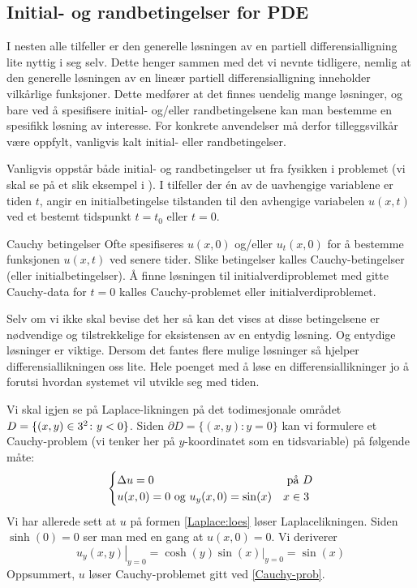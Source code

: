 \subsection{Initial- og randbetingelser for PDE}
I nesten alle tilfeller er den generelle løsningen av en partiell differensialligning
lite nyttig i seg selv. Dette henger sammen med det vi nevnte tidligere, nemlig at den generelle løsningen av en lineær partiell differensialligning inneholder vilkårlige funksjoner. Dette medfører at det finnes uendelig mange løsninger, og bare ved å spesifisere initial- og/eller randbetingelsene kan man bestemme en spesifikk løsning av interesse. For konkrete anvendelser må derfor tilleggsvilkår være oppfylt, vanligvis kalt initial- eller randbetingelser. 

Vanligvis oppstår både initial- og randbetingelser ut fra fysikken i problemet (vi skal se på et slik eksempel i ). I tilfeller der én av de uavhengige variablene er tiden \( t \), angir en initialbetingelse tilstanden til den avhengige variabelen \( u(x, t) \) ved et bestemt tidspunkt \( t = t_0 \) eller \( t = 0 \).
\begin{defn}{Cauchy betingelser}
Ofte spesifiseres \( u(x, 0) \) og/eller \( u_t(x, 0) \) for å bestemme funksjonen \( u(x, t) \) ved senere tider. Slike betingelser kalles Cauchy-betingelser (eller initialbetingelser). Å finne løsningen til initialverdiproblemet med gitte Cauchy-data for \( t = 0 \) kalles Cauchy-problemet eller initialverdiproblemet.
\end{defn}
Selv om vi ikke skal bevise det her så kan det vises at disse betingelsene er nødvendige og tilstrekkelige for eksistensen av en entydig løsning. Og entydige løsninger er viktige. Dersom det fantes flere mulige løsninger så hjelper differensiallikningen oss lite. Hele poenget med å løse en differensiallikninger jo å forutsi hvordan systemet vil utvikle seg med tiden.

\begin{eks}{}Vi skal igjen se på Laplace-likningen på det todimesjonale  området $D=\{(x,y) \in 3^2\colon y <0\}$. Siden $\partial D =\{(x,y) \colon y=0\}$ kan vi formulere et Cauchy-problem (vi tenker her på $y$-koordinatet som en tidsvariable) på følgende måte:
\begin{equation}\label{Cauchy-prob}
\begin{cases}
\Delta u = 0 & \text{ på } D\\
u(x,0)=0 \text{ og } u_y(x,0)=\sin (x) & x \in 3
\end{cases}
\end{equation}
Vi har allerede sett at $u$ på formen \eqref{Laplace:loes} løser Laplacelikningen. Siden $\sinh(0)=0$ ser man med en gang at $u(x,0)=0$.
Vi deriverer \[\left.u_y(x,y)\right|_{y=0}=\left.\cosh(y)\sin(x)\right|_{y=0} = \sin(x)\]
Oppsummert, $u$ løser Cauchy-problemet gitt ved \eqref{Cauchy-prob}.
\end{eks}

